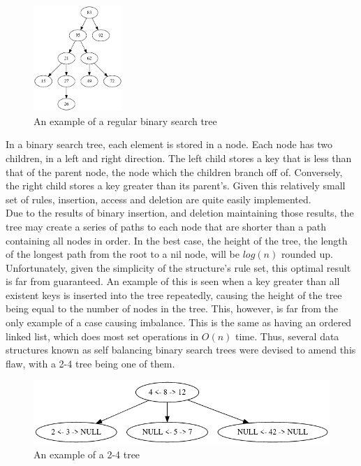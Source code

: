 \documentclass{article}
\begin{document}
\begin{figure}[ht]
    \centering
    \includegraphics[height = 4cm]{bstexample.png}
    \caption{An example of a regular binary search tree}
\end{figure}

\noindent
In a binary search tree, each element is stored in a node. Each node has two children, in a left and right direction. The left child stores a key that is less than that of the parent node, the node which the children branch off of. Conversely, the right child stores a key greater than its parent’s. 
Given this relatively small set of rules, insertion, access and deletion are quite easily implemented.
\\

\noindent
Due to the results of binary insertion, and deletion maintaining those results, the tree may create a series of paths to each node that are shorter than a path containing all nodes in order. In the best case, the height of the tree, the length of the longest path from the root to a nil node, will be $log(n)$ rounded up. Unfortunately, given the simplicity of the structure’s rule set, this optimal result is far from guaranteed. An example of this is seen when a key greater than all existent keys is inserted into the tree repeatedly, causing the height of the tree being equal to the number of nodes in the tree. This, however, is far from the only example of a case causing imbalance. This is the same as having an ordered linked list, which does most set operations in $O(n)$ time. Thus, several data structures known as self balancing binary search trees were devised to amend this flaw, with a 2-4 tree being one of them.
\\

\begin{figure}[ht]
    \centering
    \includegraphics[width = 12cm]{24treeexample.png}
    \caption{An example of a 2-4 tree}
    \label{fig:my_label}
\end{figure}
\end{document}
